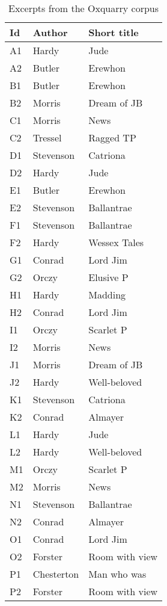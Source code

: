 \twocolumn
\begin{table}[H]
  \small
  \centering
  \caption{Excerpts from the Oxquarry corpus}
  \label{tbl:oxquarry_corpus}

  \begin{tabular}{l l l}
    \toprule
    \textbf{Id} &
    \textbf{Author} &
    \textbf{Short title} \\
    \midrule
    A1 & Hardy & Jude \\
    A2 & Butler & Erewhon \\
    B1 & Butler & Erewhon \\
    B2 & Morris & Dream of JB \\
    C1 & Morris & News \\
    C2 & Tressel & Ragged TP \\
    D1 & Stevenson & Catriona \\
    D2 & Hardy & Jude \\
    E1 & Butler & Erewhon \\
    E2 & Stevenson & Ballantrae \\
    F1 & Stevenson & Ballantrae \\
    F2 & Hardy & Wessex Tales \\
    G1 & Conrad & Lord Jim \\
    G2 & Orczy & Elusive P \\
    H1 & Hardy & Madding \\
    H2 & Conrad & Lord Jim \\
    I1 & Orczy & Scarlet P \\
    I2 & Morris & News \\
    J1 & Morris & Dream of JB \\
    J2 & Hardy & Well-beloved \\
    K1 & Stevenson & Catriona \\
    K2 & Conrad & Almayer \\
    L1 & Hardy & Jude \\
    L2 & Hardy & Well-beloved \\
    M1 & Orczy & Scarlet P \\
    M2 & Morris & News \\
    N1 & Stevenson & Ballantrae \\
    N2 & Conrad & Almayer \\
    O1 & Conrad & Lord Jim \\
    O2 & Forster & Room with view \\
    P1 & Chesterton & Man who was \\
    P2 & Forster & Room with view \\

\end{tabular}
\end{table}
